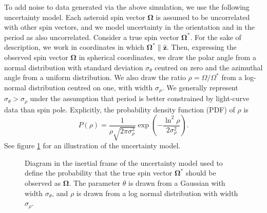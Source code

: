 \documentclass[fleqn,usenatbib]{mnras}
\newcommand{\unit}[1]{\bm{\hat{#1}}}
\newcommand{\parens}[1]{\left( #1 \right)}
\begin{document}
To add noise to data generated via the above simulation, we use the following uncertainty model. Each asteroid spin vector $\bm \Omega$ is assumed to be uncorrelated with other spin vectors, and we model uncertainty in the orientation and in the period as also uncorrelated. Consider a true spin vector $\bm \Omega^*$. For the sake of description, we work in coordinates in which $\bm \Omega^* \parallel \unit z$. Then, expressing the observed spin vector $\bm \Omega$ in spherical coordinates, we draw the polar angle from a normal distribution with standard deviation $\sigma_\theta$ centred on zero and the azimuthal angle from a uniform distribution. We also draw the ratio $\rho=\Omega/\Omega^*$ from a log-normal distribution centred on one, with width $\sigma_\rho$. We generally represent $\sigma_\theta > \sigma_\rho$ under the assumption that period is better constrained by light-curve data than spin pole. Explicitly, the probability density function (PDF) of $\rho$ is 
\begin{equation}
  P(\rho) = \frac{1}{\rho\sqrt{2\pi \sigma_\rho^2}} \exp\parens{-\frac{\ln^2\rho}{2\sigma_\rho^2}}.
\end{equation}
See figure \ref{fig:uncertainty-model} for an illustration of the uncertainty model.

\begin{figure}
  \centering
  \caption{Diagram in the inertial frame of the uncertainty model used to define the probability that the true spin vector $\bm \Omega^*$ should be observed as $\bm \Omega$. The parameter $\theta$ is drawn from a Gaussian with width $\sigma_\theta$, and $\rho$ is drawn from a log normal distribution with width $\sigma_\rho$.}
  \label{fig:uncertainty-model}
\end{figure}
\end{document}
